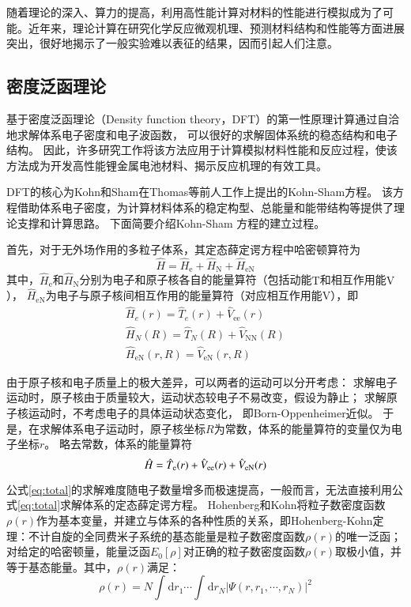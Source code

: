随着理论的深入、算力的提高，利用高性能计算对材料的性能进行模拟成为了可能。近年来，理论计算在研究化学反应微观机理、预测材料结构和性能等方面进展突出，很好地揭示了一般实验难以表征的结果，因而引起人们注意。

\subsection{密度泛函理论}

基于密度泛函理论（Density function theory，DFT）的第一性原理计算通过自洽地求解体系电子密度和电子波函数，
可以很好的求解固体系统的稳态结构和电子结构。
因此，许多研究工作将该方法应用于计算模拟材料性能和反应过程，使该方法成为开发高性能锂金属电池材料、揭示反应机理的有效工具。

DFT的核心为Kohn和Sham在Thomas等前人工作上提出的Kohn-Sham方程。
该方程借助体系电子密度，为计算材料体系的稳定构型、总能量和能带结构等提供了理论支撑和计算思路。
下面简要介绍Kohn-Sham 方程的建立过程。

首先，对于无外场作用的多粒子体系，其定态薛定谔方程中哈密顿算符为
\begin{equation}
    \hat{H}=\hat{H}_{\mathrm{e}}+\hat{H}_{\mathrm{N}}+\hat{H}_{\mathrm{eN}}
\end{equation}
其中，$\hat{H}_{\mathrm{e}}$和$\hat{H}_{\mathrm{N}}$分别为电子和原子核各自的能量算符（包括动能$\mathrm{T}$和相互作用能$\mathrm{V}$），
$\hat{H}_{\mathrm{eN}}$为电子与原子核间相互作用的能量算符（对应相互作用能$\mathrm{V}$），即
\begin{gather}
    \hat{H}_e(r) = \hat{T}_e(r)+\hat{V}_{\mathrm{ee}}(r) \\
    \hat{H}_N(R) = \hat{T}_N(R)+\hat{V}_{\mathrm{NN}}(R) \\ 
    \hat{H}_{\mathrm{eN}}(r,R) = \hat{V}_{\mathrm{eN}}(r,R) 
\end{gather}

由于原子核和电子质量上的极大差异，可以两者的运动可以分开考虑：
求解电子运动时，原子核由于质量较大，运动状态较电子不易改变，假设为静止；
求解原子核运动时，不考虑电子的具体运动状态变化，
即Born-Oppenheimer近似。
于是，在求解体系电子运动时，原子核坐标$R$为常数，体系的能量算符的变量仅为电子坐标$r$。
略去常数，体系的能量算符
\begin{equation}{\label{eq:total}}
    \hat{H}=\hat{T}_{\mathrm{e}}(r)+\hat{V}_{\mathrm{ee}}(r)+\hat{V}_{\mathrm{eN}}(r)
\end{equation}

公式\ref{eq:total}的求解难度随电子数量增多而极速提高，一般而言，无法直接利用公式\ref{eq:total}求解体系的定态薛定谔方程。
Hohenberg和Kohn将粒子数密度函数$\rho(r)$作为基本变量，并建立与体系的各种性质的关系，即Hohenberg-Kohn定理：不计自旋的全同费米子系统的基态能量是粒子数密度函数$\rho(r)$的唯一泛函；对给定的哈密顿量，能量泛函$E_0[\rho]$对正确的粒子数密度函数$\rho(r)$取极小值，并等于基态能量。其中，$\rho(r)$满足：
\begin{equation}
    \rho(r)=N\int_{}^{}\mathrm{d}r_1 \cdots \int_{}^{}\mathrm{d}r_N | \varPsi (r,r_1,\cdots,r_N) |^2
\end{equation}

